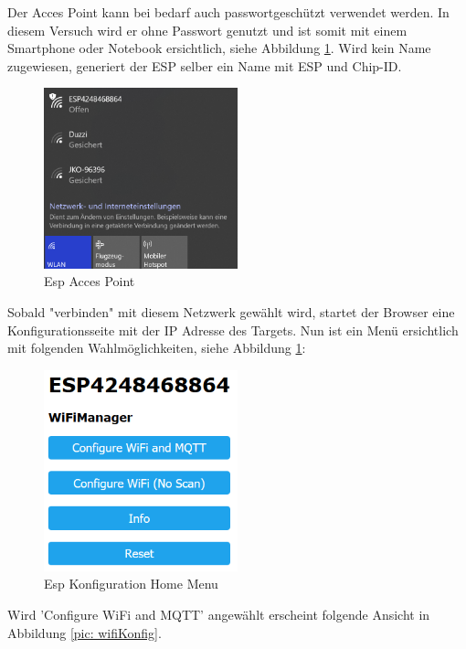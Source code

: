 Der Acces Point kann bei bedarf auch passwortgeschützt verwendet werden. In diesem Versuch wird er ohne Passwort genutzt und ist somit mit einem Smartphone oder Notebook ersichtlich, siehe Abbildung \ref{pic: wifiNetz}. Wird kein Name zugewiesen, generiert der ESP selber ein Name mit ESP und Chip-ID.
\begin{figure}[H]
	\centering
	\includegraphics[width=0.5\textwidth]{graphics/WifiNetz.png}
	\caption{Esp Acces Point}
	\label{pic: wifiNetz}
\end{figure} 
Sobald "verbinden" mit diesem Netzwerk gewählt wird, startet der Browser eine Konfigurationsseite mit der IP Adresse des Targets. Nun ist ein Menü ersichtlich mit folgenden Wahlmöglichkeiten, siehe Abbildung \ref{pic: wifiNetz}:

\begin{figure}[H]
	\centering
	\includegraphics[width=0.5\textwidth]{graphics/WifiHome.png}
	\caption{Esp Konfiguration Home Menu}
	\label{pic: wifiHome}
\end{figure}   

Wird 'Configure WiFi and MQTT' angewählt erscheint folgende Ansicht in Abbildung \ref{pic: wifiKonfig}.

